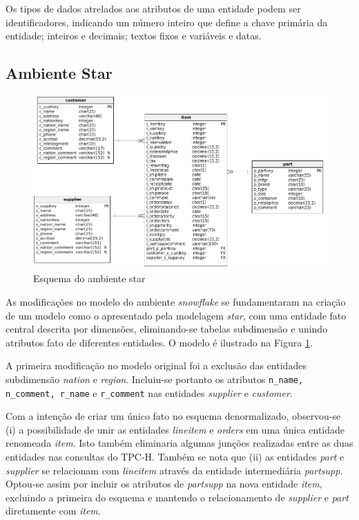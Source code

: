 \documentclass[conference]{IEEEtran}
\begin{document}
Os tipos de dados atrelados aos atributos de uma entidade podem ser identificadores, indicando um número inteiro que define a chave primária da entidade; inteiros e decimais; textos fixos e variáveis e datas.

\subsection{Ambiente Star}
\label{sec:star}

\begin{figure}[htpb]
	\centering
		\includegraphics[width=\textwidth]{star}
	\caption{Esquema do ambiente star}
	\label{fig:star}
\end{figure}

As modificações no modelo do ambiente \textit{snowflake} se fundamentaram na criação de um modelo como o apresentado pela modelagem \textit{star}, com uma entidade fato central descrita por dimensões, eliminando-se tabelas subdimensão e unindo atributos fato de diferentes entidades. O modelo é ilustrado na Figura \ref{fig:star}.
 
A primeira modificação no modelo original foi a exclusão das entidades subdimensão \textit{nation} e \textit{region}. Incluiu-se portanto os atributos \texttt{n\_name, n\_comment, r\_name} e \texttt{r\_comment} nas entidades \textit{supplier} e \textit{customer}. 

Com a intenção de criar um único fato no esquema denormalizado, observou-se (i) a possibilidade de unir as entidades \textit{lineitem} e \textit{orders} em uma única entidade renomeada \textit{item}. Isto também eliminaria algumas junções realizadas entre as duas entidades nas consultas do TPC-H. Também se nota que (ii) as entidades \textit{part} e \textit{supplier} se relacionam com \textit{lineitem} através da entidade intermediária \textit{partsupp}. Optou-se assim por incluir os atributos de \textit{partsupp} na nova entidade \textit{item}, excluindo a primeira do esquema e mantendo o relacionamento de \textit{supplier} e \textit{part} diretamente com \textit{item}.
\end{document}
